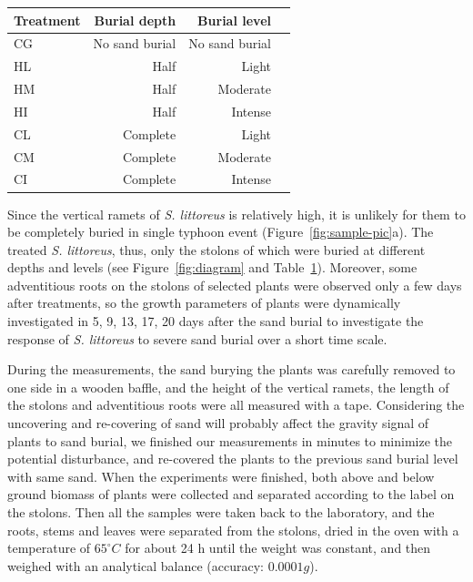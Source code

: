 \documentclass[]{interact}
\theoremstyle{plain}%
\theoremstyle{definition}
\theoremstyle{remark}
\begin{document}
\begin{table}
  {\begin{tabular}{lrrr} 
  \toprule
   Treatment & Burial depth & Burial level \\ 
  \midrule
   CG & No sand burial & No sand burial \\
   HL & Half & Light \\
   HM & Half & Moderate \\
   HI & Half & Intense \\
   CL & Complete & Light \\
   CM & Complete & Moderate \\
   CI & Complete & Intense \\
  \bottomrule
  \end{tabular}}
  \label{tab:treatment}
\end{table}

Since the vertical ramets of \textit{S. littoreus} is relatively high, it is unlikely for them to be completely buried in single typhoon event (Figure~\ref{fig:sample-pic}a). The treated \textit{S. littoreus}, thus, only the stolons of which were buried at different depths and levels (see Figure~\ref{fig:diagram} and Table~\ref{tab:treatment}). Moreover, some adventitious roots on the stolons of selected plants were observed only a few days after treatments, so the growth parameters of plants were dynamically investigated in 5, 9, 13, 17, 20 days after the sand burial to investigate the response of \textit{S. littoreus} to severe sand burial over a short time scale.

During the measurements, the sand burying the plants was carefully removed to one side in a wooden baffle, and the height of the vertical ramets, the length of the stolons and adventitious roots were all measured with a tape. Considering the uncovering and re-covering of sand will probably affect the gravity signal of plants to sand burial, we finished our measurements in minutes to minimize the potential disturbance, and re-covered the plants to the previous sand burial level with same sand. When the experiments were finished, both above and below ground biomass of plants were collected and separated according to the label on the stolons. Then all the samples were taken back to the laboratory, and the roots, stems and leaves were separated from the stolons, dried in the oven with a temperature of $65^{\circ}C$ for about 24 h until the weight was constant, and then weighed with an analytical balance (accuracy: $0.0001g$).
\end{document}
